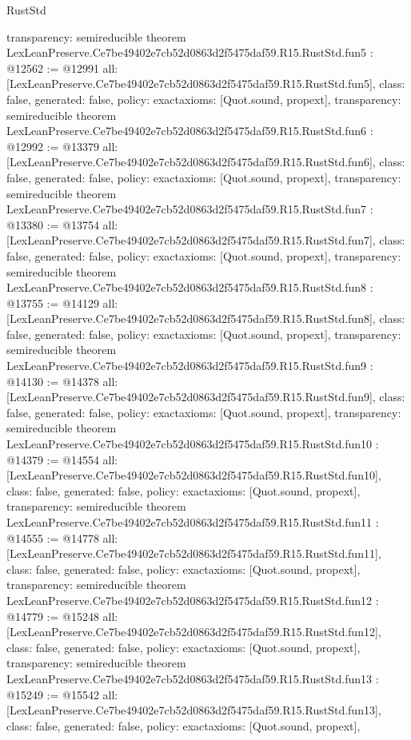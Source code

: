\begin{lexlean}{RustStd}
\begin{coremodule}
{  transparency: semireducible
}
theorem LexLeanPreserve.Ce7be49402e7cb52d0863d2f5475daf59.R15.RustStd.fun5 : @12562 := @12991 {
  all: [LexLeanPreserve.Ce7be49402e7cb52d0863d2f5475daf59.R15.RustStd.fun5],
  class: false,
  generated: false,
  policy: exact{axioms: [Quot.sound, propext]},
  transparency: semireducible
}
theorem LexLeanPreserve.Ce7be49402e7cb52d0863d2f5475daf59.R15.RustStd.fun6 : @12992 := @13379 {
  all: [LexLeanPreserve.Ce7be49402e7cb52d0863d2f5475daf59.R15.RustStd.fun6],
  class: false,
  generated: false,
  policy: exact{axioms: [Quot.sound, propext]},
  transparency: semireducible
}
theorem LexLeanPreserve.Ce7be49402e7cb52d0863d2f5475daf59.R15.RustStd.fun7 : @13380 := @13754 {
  all: [LexLeanPreserve.Ce7be49402e7cb52d0863d2f5475daf59.R15.RustStd.fun7],
  class: false,
  generated: false,
  policy: exact{axioms: [Quot.sound, propext]},
  transparency: semireducible
}
theorem LexLeanPreserve.Ce7be49402e7cb52d0863d2f5475daf59.R15.RustStd.fun8 : @13755 := @14129 {
  all: [LexLeanPreserve.Ce7be49402e7cb52d0863d2f5475daf59.R15.RustStd.fun8],
  class: false,
  generated: false,
  policy: exact{axioms: [Quot.sound, propext]},
  transparency: semireducible
}
theorem LexLeanPreserve.Ce7be49402e7cb52d0863d2f5475daf59.R15.RustStd.fun9 : @14130 := @14378 {
  all: [LexLeanPreserve.Ce7be49402e7cb52d0863d2f5475daf59.R15.RustStd.fun9],
  class: false,
  generated: false,
  policy: exact{axioms: [Quot.sound, propext]},
  transparency: semireducible
}
theorem LexLeanPreserve.Ce7be49402e7cb52d0863d2f5475daf59.R15.RustStd.fun10 : @14379 := @14554 {
  all: [LexLeanPreserve.Ce7be49402e7cb52d0863d2f5475daf59.R15.RustStd.fun10],
  class: false,
  generated: false,
  policy: exact{axioms: [Quot.sound, propext]},
  transparency: semireducible
}
theorem LexLeanPreserve.Ce7be49402e7cb52d0863d2f5475daf59.R15.RustStd.fun11 : @14555 := @14778 {
  all: [LexLeanPreserve.Ce7be49402e7cb52d0863d2f5475daf59.R15.RustStd.fun11],
  class: false,
  generated: false,
  policy: exact{axioms: [Quot.sound, propext]},
  transparency: semireducible
}
theorem LexLeanPreserve.Ce7be49402e7cb52d0863d2f5475daf59.R15.RustStd.fun12 : @14779 := @15248 {
  all: [LexLeanPreserve.Ce7be49402e7cb52d0863d2f5475daf59.R15.RustStd.fun12],
  class: false,
  generated: false,
  policy: exact{axioms: [Quot.sound, propext]},
  transparency: semireducible
}
theorem LexLeanPreserve.Ce7be49402e7cb52d0863d2f5475daf59.R15.RustStd.fun13 : @15249 := @15542 {
  all: [LexLeanPreserve.Ce7be49402e7cb52d0863d2f5475daf59.R15.RustStd.fun13],
  class: false,
  generated: false,
  policy: exact{axioms: [Quot.sound, propext]},
}
\end{coremodule}
\end{lexlean}
